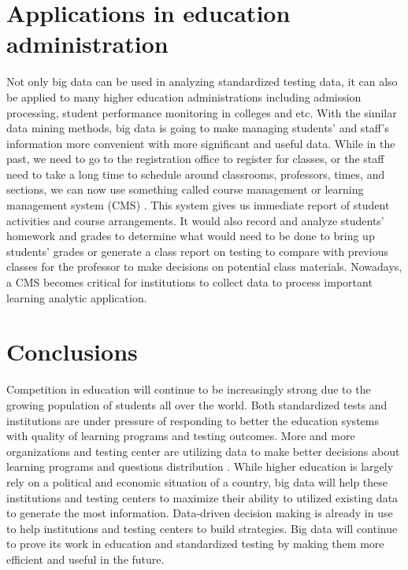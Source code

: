 \documentclass[sigconf]{acmart}
\begin{document}
\section{Applications in education administration}
Not only big data can be used in analyzing standardized testing data, it can also be applied to many higher education administrations including admission processing, student performance monitoring in colleges and etc\cite {Picciano2012}. With the similar data mining methods, big data is going to make managing students' and staff's information more convenient with more significant and useful data. While in the past, we need to go to the registration office to register for classes, or the staff need to take a long time to schedule around classrooms, professors, times, and sections, we can now use something called course management or learning management system (CMS) \cite {Picciano2012}. This system gives us immediate report of student activities and course arrangements. It would also record and analyze students' homework and grades to determine what would need to be done to bring up students' grades or 
generate a class report on testing to compare with previous classes for the professor to make decisions on potential class materials. Nowadays, a CMS becomes critical for institutions to collect data to process important learning analytic application.

\section{Conclusions}
Competition in education will continue to be increasingly strong due to the growing population of students all over the world\cite {Selingo2017}. Both standardized tests and institutions are under pressure of responding to better the education systems with quality of learning programs and testing outcomes. More and more organizations and testing center are utilizing data to make better decisions about learning programs and questions distribution \cite {Selingo2017}. While higher education is largely rely on a political and economic situation of a country, big data will help these institutions and testing centers to maximize their ability to utilized existing data to generate the most information. Data-driven decision making is already in use to help institutions and testing centers to build strategies. Big data will continue to prove its work in education and standardized testing by making them more efficient and useful in the future. 





 
\end{document}
